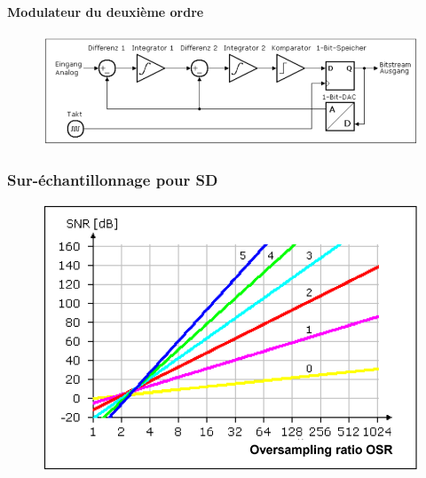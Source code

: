 \documentclass[resume]{subfiles}
\begin{document}
\paragraph{Modulateur du deuxième ordre}
\begin{figure}[H]
    \centering
    \includegraphics[width=0.8\columnwidth]{../images/OpAmp1/2ordreSD.png}
\end{figure}

\subsubsection{Sur-échantillonnage pour SD}
\begin{figure}[H]
    \centering
    \includegraphics[width=0.8\columnwidth]{../images/OpAmp1/oversampling.png}
\end{figure}
\end{document}
